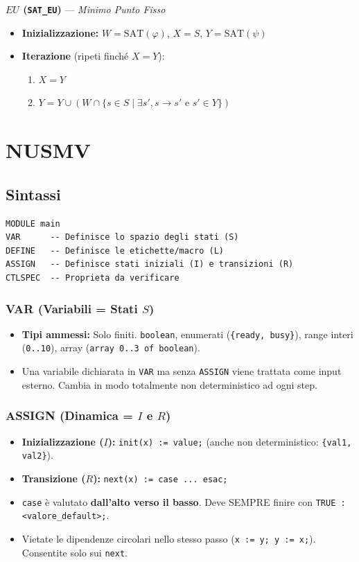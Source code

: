 \documentclass{article}
\begin{document}
\textbf{$EU$ (\texttt{SAT\_EU})} --- \textit{Minimo Punto Fisso}
\begin{itemize}
    \item \textbf{Inizializzazione:} $W = \text{SAT}(\varphi)$, $X = S$, $Y = \text{SAT}(\psi)$
    \item \textbf{Iterazione} (ripeti finché $X = Y$):
    \begin{enumerate}
        \item $X = Y$
        \item $Y = Y \cup (W \cap \{s \in S \mid \exists s', s \to s' \text{ e } s' \in Y\})$
    \end{enumerate}
\end{itemize}

\newpage
\section*{NUSMV}

\subsection*{Sintassi}

\begin{lstlisting}
MODULE main
VAR      -- Definisce lo spazio degli stati (S)
DEFINE   -- Definisce le etichette/macro (L)
ASSIGN   -- Definisce stati iniziali (I) e transizioni (R)
CTLSPEC  -- Proprieta da verificare
\end{lstlisting}

\subsubsection*{VAR (Variabili = Stati $S$)}
\begin{itemize}
    \item \textbf{Tipi ammessi:} Solo finiti. \texttt{boolean}, enumerati (\texttt{\{ready, busy\}}), range interi (\texttt{0..10}), array (\texttt{array 0..3 of boolean}).
    \item Una variabile dichiarata in \texttt{VAR} ma senza \texttt{ASSIGN} viene trattata come input esterno. Cambia in modo totalmente non deterministico ad ogni step.
\end{itemize}

\subsubsection*{ASSIGN (Dinamica = $I$ e $R$)}
\begin{itemize}
    \item \textbf{Inizializzazione ($I$):} \texttt{init(x) := value;} (anche non deterministico: \texttt{\{val1, val2\}}).
    \item \textbf{Transizione ($R$):} \texttt{next(x) := case ... esac;}
    \item \texttt{case} è valutato \textbf{dall'alto verso il basso}. Deve SEMPRE finire con \texttt{TRUE : <valore\_default>;}.
    \item Vietate le dipendenze circolari nello stesso passo (\texttt{x := y; y := x;}). Consentite solo sui \texttt{next}.
\end{itemize}
\end{document}
